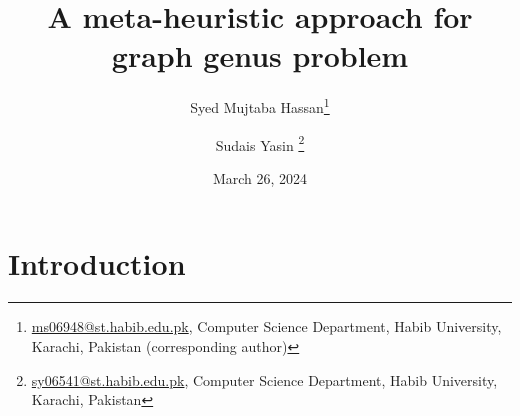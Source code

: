 \documentclass{article}
\newcommand{\Prob}[1]{\ensuremath{\text{\textsc{#1}}}}
\begin{document}
\title{A meta-heuristic approach for graph genus problem}
\author{Syed Mujtaba Hassan\footnote{\url{ms06948@st.habib.edu.pk}, Computer Science Department, Habib University, Karachi, Pakistan (corresponding author)} \and Sudais Yasin \footnote{\url{sy06541@st.habib.edu.pk}, Computer Science Department, Habib University, Karachi, Pakistan}}
\date{March 26, 2024}
\maketitle





\renewcommand\thefootnote{}


\renewcommand\thefootnote{\fnsymbol{footnote}}
\setcounter{footnote}{1}
\section{Introduction}
\end{document}
